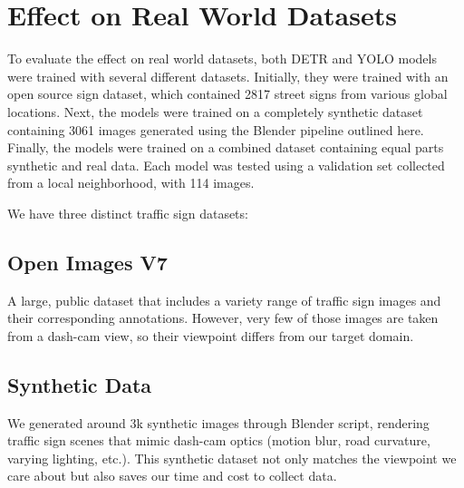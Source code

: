 \documentclass[journal]{IEEEtran}
\begin{document}
\section{Effect on Real World Datasets}

To evaluate the effect on real world datasets, both DETR \cite{DETR} and YOLO\cite{glenn_jocher_2022_7347926} models were trained with several different datasets. Initially, they were trained with an open source sign dataset, which contained 2817 street signs from various global locations. Next, the models were trained on a completely synthetic dataset containing 3061 images generated using the Blender pipeline outlined here. Finally, the models were trained on a combined dataset containing equal parts synthetic and real data. Each model was tested using a validation set collected from a local neighborhood, with 114 images. 

We have three distinct traffic sign datasets:

\subsection{Open Images V7}
A large, public dataset \cite{OID_Dataset} that includes a variety range of traffic sign images and their corresponding annotations. However, very few of those images are taken from a dash-cam view, so their viewpoint differs from our target domain.

\subsection{Synthetic Data}
We generated around 3k synthetic images through Blender script, rendering traffic sign scenes that mimic dash-cam optics (motion blur, road curvature, varying lighting, etc.). This synthetic dataset not only matches the viewpoint we care about but also saves our time and cost to collect data.
\end{document}
